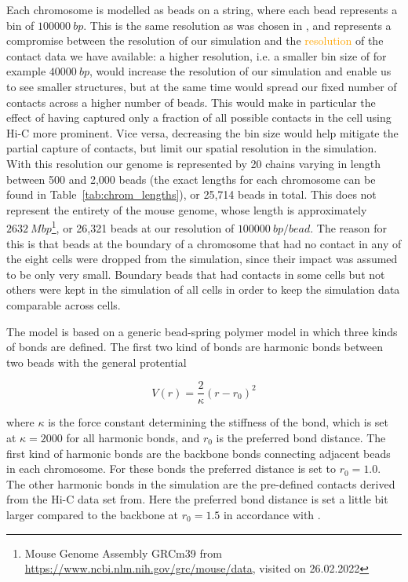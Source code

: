 Each chromosome is modelled as beads on a string, where each bead represents a bin of \(\SI{100000}{bp}\). This is the same resolution as was chosen in \cite{wettermann_minimal_2020}, and represents a compromise between the resolution of our simulation and the \textcolor{orange}{resolution} of the contact data we have available: a higher resolution, i.e. a smaller bin size of for example \(\SI{40000}{bp}\), would increase the resolution of our simulation and enable us to see smaller structures, but at the same time would spread our fixed number of contacts across a higher number of beads. This would make in particular the effect of having captured only a fraction of all possible contacts in the cell using Hi-C more prominent. Vice versa, decreasing the bin size would help mitigate the partial capture of contacts, but limit our spatial resolution in the simulation. With this resolution our genome is represented by 20 chains varying in length between 500 and 2,000 beads (the exact lengths for each chromosome can be found in Table~\ref{tab:chrom_lengths}), or 25,714 beads in total. This does not represent the entirety of the mouse genome, whose length is approximately \(\SI{2632}{Mbp}\)\footnote{Mouse Genome Assembly GRCm39 from \url{https://www.ncbi.nlm.nih.gov/grc/mouse/data}, visited on 26.02.2022}, or 26,321 beads at our resolution of \(\SI{100000}{bp \per bead}\). The reason for this is that beads at the boundary of a chromosome that had no contact in any of the eight cells were dropped from the simulation, since their impact was assumed to be only very small. Boundary beads that had contacts in some cells but not others were kept in the simulation of all cells in order to keep the simulation data comparable across cells.

The model is based on a generic bead-spring polymer model in which three kinds of bonds are defined. The first two kind of bonds are harmonic bonds between two beads with the general protential

\[
  V(r) = \frac{2} \kappa \left( r - r_0 \right)^2
\]

where \(\kappa\) is the force constant determining the stiffness of the bond, which is set at \(\kappa = 2000\) for all harmonic bonds, and \(r_0\) is the preferred bond distance. The first kind of harmonic bonds are the backbone bonds connecting adjacent beads in each chromosome. For these bonds the preferred distance is set to \(r_0 = 1.0 \). The other harmonic bonds in the simulation are the pre-defined contacts derived from the Hi-C data set from\cite{stevens_3d_2017}. Here the preferred bond distance is set a little bit larger compared to the backbone at \(r_0 = 1.5\) in accordance with \cite{wettermann_minimal_2020}.

